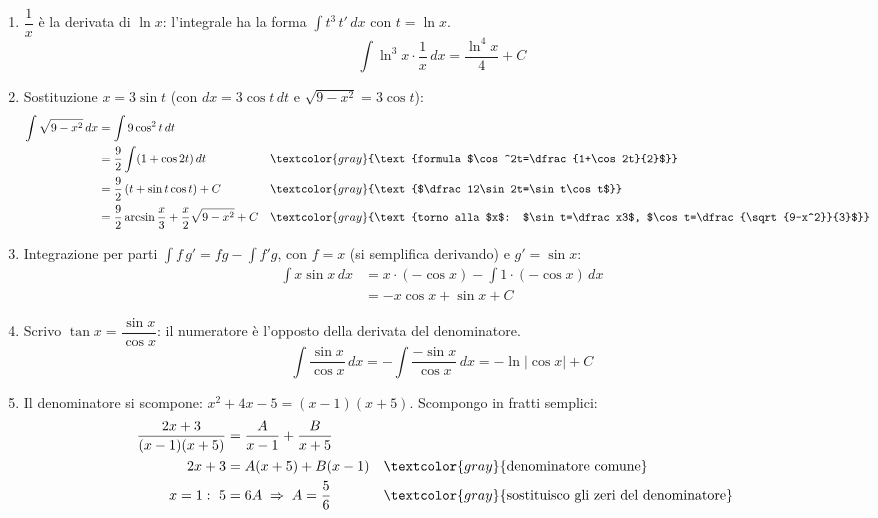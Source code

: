 \begin{question}[ID=1.1, subtitle={Integrali indefiniti — serie 1}, tags={integrali, indefiniti}, difficulty=media]
\begin{explanation}
\begin{enumerate}
    \[\begin{aligned}
    \int\dfrac{1}{2x+1}\,dx &= \dfrac12\int\dfrac{2}{2x+1}\,dx=\dfrac12\ln|2x+1| && \textcolor{gray}{\text{moltiplico e divido per $2$}}\\
    \Big[\dfrac12\ln|2x+1|\Big]_0^1 &= \dfrac12\ln3-\dfrac12\ln1=\dfrac{\ln3}{2} && \textcolor{gray}{\text{teorema fondamentale}}
    \end{aligned}\]
    \item $\dfrac1x$ è la derivata di $\ln x$: l'integrale ha la forma $\int t^3\,t'\,dx$ con $t=\ln x$.
    \[ \int\ln^3x\cdot\dfrac1x\,dx=\dfrac{\ln^4x}{4}+C \]
    \item Sostituzione $x=3\sin t$ (con $dx=3\cos t\,dt$ e $\sqrt{9-x^2}=3\cos t$):
    \[\begin{aligned}
    \int\sqrt{9-x^2}\,dx &= \int9\cos^2t\,dt\\
    &= \dfrac92\int(1+\cos2t)\,dt && \textcolor{gray}{\text{formula $\cos^2t=\dfrac{1+\cos2t}{2}$}}\\
    &= \dfrac92\left(t+\sin t\cos t\right)+C && \textcolor{gray}{\text{$\dfrac12\sin2t=\sin t\cos t$}}\\
    &= \dfrac92\arcsin\dfrac x3+\dfrac x2\sqrt{9-x^2}+C && \textcolor{gray}{\text{torno alla $x$: $\sin t=\dfrac x3$, $\cos t=\dfrac{\sqrt{9-x^2}}{3}$}}
    \end{aligned}\]
    \item Integrazione per parti $\int f\,g'=fg-\int f'g$, con $f=x$ (si semplifica derivando) e $g'=\sin x$:
    \[\begin{aligned}
    \int x\sin x\,dx &= x\cdot(-\cos x)-\int1\cdot(-\cos x)\,dx\\
    &= -x\cos x+\sin x+C
    \end{aligned}\]
    \item Scrivo $\tan x=\dfrac{\sin x}{\cos x}$: il numeratore è l'opposto della derivata del denominatore.
    \[ \int\dfrac{\sin x}{\cos x}\,dx=-\int\dfrac{-\sin x}{\cos x}\,dx=-\ln|\cos x|+C \]
    \item Il denominatore si scompone: $x^2+4x-5=(x-1)(x+5)$. Scompongo in fratti semplici:
    \[\begin{aligned}
    \dfrac{2x+3}{(x-1)(x+5)} &= \dfrac{A}{x-1}+\dfrac{B}{x+5}\\
    2x+3 &= A(x+5)+B(x-1) && \textcolor{gray}{\text{denominatore comune}}\\
    x=1:\ 5 &= 6A \;\Rightarrow\; A=\dfrac56 && \textcolor{gray}{\text{sostituisco gli zeri del denominatore}}\\

\end{aligned}\]
\end{enumerate}
\end{explanation}
\end{question}
